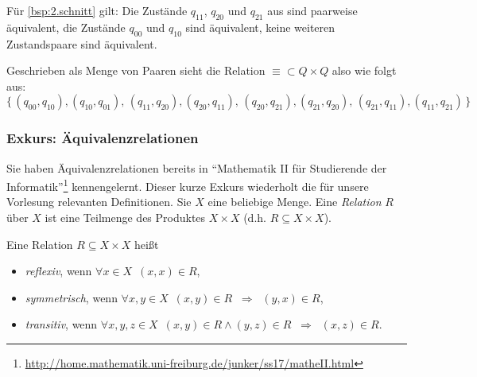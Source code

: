 \begin{Bsp}
Für \autoref{bsp:2.schnitt} gilt: 
Die Zustände $q_{11}$, $q_{20}$ und $q_{21}$ aus sind paarweise äquivalent,
die Zustände $q_{00}$ und $q_{10}$ sind äquivalent,
keine weiteren Zustandspaare sind äquivalent.

Geschrieben als Menge von Paaren sieht die Relation $\equiv\subset Q\times Q$ also wie folgt aus:
$$\{ \,
(q_{00}, q_{10}), (q_{10}, q_{01}), \,
(q_{11}, q_{20}), (q_{20}, q_{11}), \,
(q_{20}, q_{21}), (q_{21}, q_{20}), \,
(q_{21}, q_{11}), (q_{11}, q_{21}) \,
\}$$
\end{Bsp}


\subsubsection{Exkurs: Äquivalenzrelationen}
Sie haben Äquivalenzrelationen bereits in "`Mathematik II für Studierende der Informatik"'\footnote{\url{http://home.mathematik.uni-freiburg.de/junker/ss17/matheII.html}} kennengelernt.
Dieser kurze Exkurs wiederholt die für unsere Vorlesung relevanten Definitionen.
Sie $X$ eine beliebige Menge. Eine \emph{Relation} $R$ über $X$ ist eine Teilmenge des Produktes $X\times X$ (d.h. $R\subseteq X\times X$).

Eine Relation $R\subseteq X\times X$ heißt
\begin{itemize}
 \item \emph{reflexiv}, wenn $\forall x\in X$\ $(x,x)\in R$, 
 \item \emph{symmetrisch}, wenn $\forall x, y\in X$\ $(x,y)\in R \;\; \Rightarrow\;\; (y,x)\in R$, 
 \item \emph{transitiv}, wenn $\forall x, y, z\in X$\ $(x,y)\in R \land (y,z)\in R\;\; \Rightarrow\;\; (x,z)\in R$.
\end{itemize}

